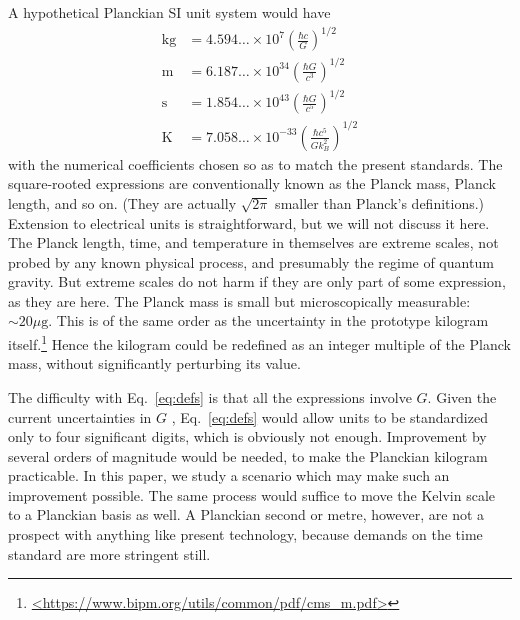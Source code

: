 \documentclass[]{rsos}
\begin{document}
A hypothetical Planckian SI unit system would have
\begin{equation} \label{eq:defs}
\begin{aligned}
\mathrm{kg} &= 4.594\ldots \times 10^7
               \left(\frac{\hbar c}{G}\right)^{\!1/2} \\
\mathrm{m}  &= 6.187\ldots \times 10^{34}
               \left(\frac{\hbar G}{c^3}\right)^{\!1/2} \\
\mathrm{s}  &= 1.854\ldots \times 10^{43}
               \left(\frac{\hbar G}{c^5}\right)^{\!1/2} \\
\mathrm{K}  &= 7.058\ldots \times 10^{-33}
               \left(\frac{\hbar c^5}{Gk_B^2}\right)^{\!1/2}
\end{aligned}
\end{equation}
with the numerical coefficients chosen so as to match the present
standards.  The square-rooted expressions are conventionally known as
the Planck mass, Planck length, and so on.  (They are actually
$\sqrt{2\pi}$ smaller than Planck's definitions.)  Extension to
electrical units is straightforward, but we will not discuss it here.
The Planck length, time, and temperature in themselves are extreme
scales, not probed by any known physical process, and presumably the
regime of quantum gravity.  But extreme scales do not harm if they are
only part of some expression, as they are here.  The Planck mass is
small but microscopically measurable: $\sim20\mu\mathrm{g}$.  This is
of the same order as the uncertainty in the prototype kilogram
itself.\footnote{\url{<https://www.bipm.org/utils/common/pdf/cms_m.pdf>}}
Hence the kilogram could be redefined as an integer multiple of the
Planck mass, without significantly perturbing its value.

The difficulty with Eq.~\eqref{eq:defs} is that all the expressions
involve $G$.  Given the current uncertainties in $G$ \citep{CODATA17},
Eq.~\eqref{eq:defs} would allow units to be standardized only to four
significant digits, which is obviously not enough.  Improvement by
several orders of magnitude would be needed, to make the Planckian
kilogram practicable.  In this paper, we study a scenario which may
make such an improvement possible.  The same process would suffice to
move the Kelvin scale to a Planckian basis as well.  A Planckian
second or metre, however, are not a prospect with anything like
present technology, because demands on the time standard are more
stringent still.
\end{document}
